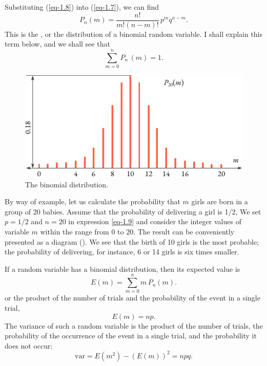 Substituting (\ref{eq-1.8}) into (\ref{eq-1.7}), we can find
\begin{equation}%
P_{n}(m) = \frac{n!}{m! (n-m)!} \, p^{m}q^{n-m}.
\label{eq-1.9}
\end{equation}
This is the , or the distribution of a binomial
random variable. I shall explain this term below, and we shall see that
\begin{equation}%
\sum_{m=0}^{n}  P_{n}\,(m) = 1.
\label{eq-1.10}
\end{equation}


\begin{figure}[!h]
 \centering
 \includegraphics[width=0.8\tfwidth]{figures/binomial-dist.pdf}
\caption{The binomial distribution. \label{binomial-dist}}
 \end{figure}


By way of example, let us calculate the probability that $m$ girls are
born in a group of 20 babies. Assume that the probability of delivering
a girl is 1/2, We set $p= 1/2$ and $n = 20$ in expression \eqref{eq-1.9} and consider the integer values of variable $m$ within the range from 0 to 20. The result can be conveniently presented as a diagram (). We see that the birth of 10 girls is the most probable; the probability of delivering, for instance, 6 or 14 girls is six times smaller.

If a random variable has a binomial distribution, then its expected
value is
\begin{equation*}
E(m) = \sum_{m=0}^{n} m \, P_{n}(m).
\end{equation*}
or the product of the number of trials and the probability of the event
in a single trial,
\begin{equation}%
E(m) = np.
\label{eq-1.11}
\end{equation}
The variance of such a random variable is the product of the number of
trials, the probability of the occurrence of the event in a single trial, and
the probability it does not occur:
\begin{equation}%
\textrm{var} = E(m^{2}) - (E(m))^2 = npq.
\label{eq-1.12}
\end{equation}


